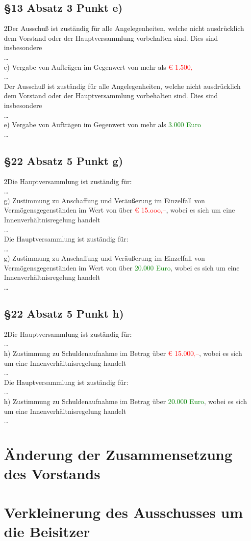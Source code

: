 \documentclass[10pt,a4paper,parskip=half]{scrartcl}
\newcommand{\new}[1]{\textcolor{Green}{#1}}
\newcommand{\old}[1]{\textcolor{Red}{#1}}
\newcommand{\compare}[3]{\subsection*{#1}\begin{multicols}{2}#2\columnbreak\\#3\end{multicols}}
\begin{document}
  \compare{§13 Absatz 3 Punkt e)}
  {Der Ausschuß ist zuständig für alle Angelegenheiten, welche nicht ausdrücklich dem
    Vorstand oder der Hauptversammlung vorbehalten sind. Dies sind insbesondere\\\dots\\
  e) Vergabe von Aufträgen im Gegenwert von mehr als \old{€ 1.500,--}\\\dots}
  {Der Ausschuß ist zuständig für alle Angelegenheiten, welche nicht ausdrücklich dem
    Vorstand oder der Hauptversammlung vorbehalten sind. Dies sind insbesondere\\\dots\\
    e) Vergabe von Aufträgen im Gegenwert von mehr als \new{3.000 Euro}\\\dots}

  \compare{§22 Absatz 5 Punkt g)}
  {Die Hauptversammlung ist zuständig für: \\ \dots\\
    g) Zustimmung zu Anschaffung und Veräußerung im Einzelfall von Vermögensgegenständen im Wert von über \old{€ 15.ooo,--}, wobei es sich um eine Innenverhältnisregelung handelt\\\dots}
  {Die Hauptversammlung ist zuständig für: \\ \dots\\g) Zustimmung zu Anschaffung und Veräußerung im Einzelfall von Vermögensgegenständen im Wert von über \new{20.000 Euro}, wobei es sich um eine Innenverhältnisregelung handelt\\\dots}

  \compare{§22 Absatz 5 Punkt h)}
  {Die Hauptversammlung ist zuständig für: \\ \dots\\h) Zustimmung zu Schuldenaufnahme im Betrag über \old{€ 15.000,--}, wobei es sich um eine Innenverhältnisregelung handelt\\\dots}
  {Die Hauptversammlung ist zuständig für: \\ \dots\\h) Zustimmung zu Schuldenaufnahme im Betrag über \new{20.000 Euro}, wobei es sich um eine Innenverhältnisregelung handelt\\\dots}

  \section{Änderung der Zusammensetzung des Vorstands}
  \section{Verkleinerung des Ausschusses um die Beisitzer}
\end{document}

